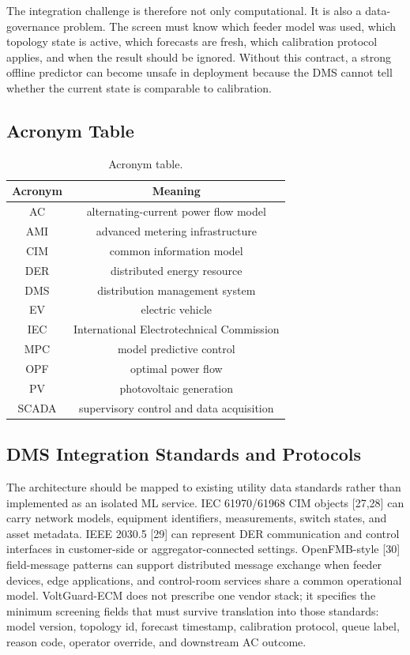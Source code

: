 \documentclass[
  preprint,12pt]{elsarticle}
\begin{document}
The integration challenge is therefore not only computational. It is
also a data-governance problem. The screen must know which feeder model
was used, which topology state is active, which forecasts are fresh,
which calibration protocol applies, and when the result should be
ignored. Without this contract, a strong offline predictor can become
unsafe in deployment because the DMS cannot tell whether the current
state is comparable to calibration.

\subsection{Acronym Table}\label{acronym-table}

\begin{longtable}[]{@{}cc@{}}
\caption{Acronym table.}\\\toprule\noalign{}
Acronym & Meaning \\
\midrule\noalign{}
\endhead
\bottomrule\noalign{}
\endlastfoot
AC & alternating-current power flow model \\
AMI & advanced metering infrastructure \\
CIM & common information model \\
DER & distributed energy resource \\
DMS & distribution management system \\
EV & electric vehicle \\
IEC & International Electrotechnical Commission \\
MPC & model predictive control \\
OPF & optimal power flow \\
PV & photovoltaic generation \\
SCADA & supervisory control and data acquisition \\
\end{longtable}

\subsection{DMS Integration Standards and
Protocols}\label{dms-integration-standards-and-protocols}

The architecture should be mapped to existing utility data standards
rather than implemented as an isolated ML service. IEC 61970/61968 CIM
objects {[}27,28{]} can carry network models, equipment identifiers,
measurements, switch states, and asset metadata. IEEE 2030.5 {[}29{]}
can represent DER communication and control interfaces in customer-side
or aggregator-connected settings. OpenFMB-style {[}30{]} field-message
patterns can support distributed message exchange when feeder devices,
edge applications, and control-room services share a common operational
model. VoltGuard-ECM does not prescribe one vendor stack; it specifies
the minimum screening fields that must survive translation into those
standards: model version, topology id, forecast timestamp, calibration
protocol, queue label, reason code, operator override, and downstream AC
outcome.
\end{document}
